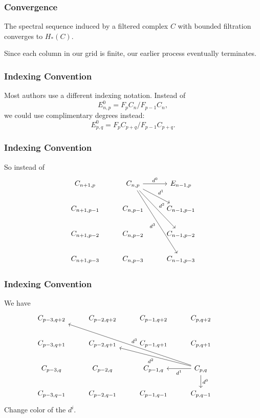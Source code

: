 \documentclass{beamer}
\begin{document}

\begin{frame}
	\frametitle{Convergence}

	\begin{theorem}
		The spectral sequence induced by a filtered complex $C$ with bounded filtration converges to $H_{*}(C)$.
	\end{theorem}

	\vspace{5mm}

	Since each column in our grid is finite, our earlier process eventually terminates.
\end{frame}


\begin{frame}
	\frametitle{Indexing Convention}

	Most authors use a different indexing notation. Instead of
	\[
	E_{n,p}^{0} = F_{p}C_{n} / F_{p-1}C_{n},
	\] we could use complimentary degrees instead:
	\[
	E_{p,q}^{0} = F_{p}C_{p+q} / F_{p-1}C_{p+q}.
	\] 
\end{frame}

\begin{frame}[fragile]
	\frametitle{Indexing Convention}

	So instead of
	\[
	\begin{tikzcd}
		C_{n+1,p}&C_{n,p}\rar{d^{0}}\arrow[rd,"d^{1}"]\arrow[rdd,"d^{2}"]\arrow[rddd,"d^{3}"']&E_{n-1,p}\\
		C_{n+1,p-1}&C_{n,p-1}&C_{n-1,p-1}\\
		C_{n+1,p-2}&C_{n,p-2}&C_{n-1,p-2}\\
		C_{n+1,p-3}&C_{n,p-3}&C_{n-1,p-3}
	\end{tikzcd}
	\] 
\end{frame}

\begin{frame}[fragile]
	\frametitle{Indexing Convention}

	We have
	\[
	\begin{tikzcd}
		C_{p-3,q+2} & C_{p-2,q+2} & C_{p-1,q+2} & C_{p,q+2} \\
		C_{p-3,q+1} & C_{p-2,q+1} & C_{p-1,q+1} & C_{p,q+1} & \\
		C_{p-3,q} & C_{p-2,q} & C_{p-1,q} & C_{p,q}\dar{d^{0}}\lar{d^{1}}\arrow[llu,"d^{2}"]\arrow[llluu,"d^{3}"'] \\
		C_{p-3,q-1} & C_{p-2,q-1} & C_{p-1,q-1} & C_{p,q-1}
	\end{tikzcd}
	\] 
	{\color{red}Change color of the $d^{i}$.}
\end{frame}
\end{document}
